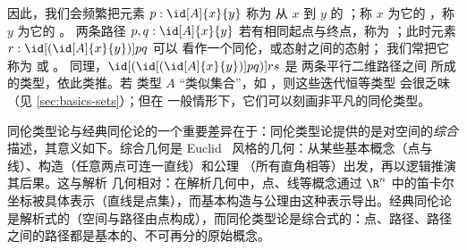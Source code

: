 因此，我们会频繁把元素 $p : \id[A]{x}{y}$ 称为
从 $x$ 到 $y$ 的 
；称 $x$ 为它的 
，称 $y$ 为它的 。
两条路径 $p,q : \id[A]{x}{y}$ 若有相同起点与终点，称为 
；此时元素 $r : \id[{(\id[A]{x}{y})}]{p}{q}$ 可以
看作一个同伦，或态射之间的态射；
我们常把它称为 
%
或 。
%
%
同理，$\id[{(\id[{(\id[A]{x}{y})}]{p}{q})}]{r}{s}$ 是
两条平行二维路径之间
%
所成的类型，依此类推。若
类型 $A$ “类似集合”，如 \nat，则这些迭代恒等类型
会很乏味（见 \cref{sec:basics-sets}）；但在
一般情形下，它们可以刻画非平凡的同伦类型。


同伦类型论与经典同伦论的一个重要差异在于：同伦类型论提供的是对空间的\emph{综合}
%
%
%
描述，其意义如下。综合几何是 Euclid~\cite{Euclid} 风格的几何：从某些基本概念（点与线）、构造（任意两点可连一直线）和公理
（所有直角相等）出发，再以逻辑推演其后果。这与解析
%
几何相对：在解析几何中，点、线等概念通过 $\R^n$ 中的笛卡尔坐标被具体表示（直线是点集），而基本构造与公理由这种表示导出。经典同伦论是解析式的（空间与路径由点构成），而同伦类型论是综合式的：点、路径、路径之间的路径都是基本的、不可再分的原始概念。

